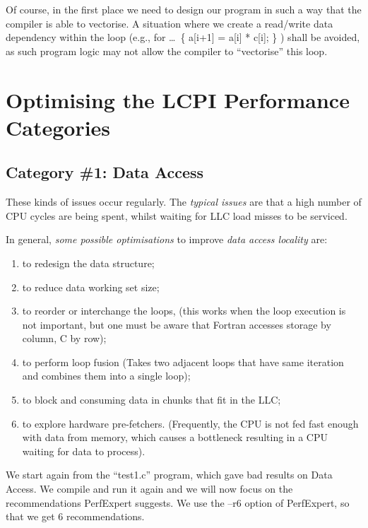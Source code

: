 Of course, in the first place we need to design our program in such a way that the compiler is able to vectorise. A situation where we create a read/write data dependency within the loop (e.g., for \ldots\  \{ a[i+1] = a[i] * c[i]; \} ) shall be avoided, as such program logic may not allow the compiler to ``vectorise'' this loop.

\section{Optimising the LCPI Performance Categories}
\label{sec:Optimizing_the_LCPI_Performance_Categories}

\subsection{Category \#1: Data Access}
\label{subsec:CAT1_Data_Access}

These kinds of issues occur regularly. The \emph{typical issues} are that a high number of CPU cycles are being spent, whilst waiting for LLC load misses to be serviced.

In general, \emph{some possible optimisations} to improve \emph{data access locality} are:

\begin{enumerate}
  \item  to redesign the data structure;
  \item  to reduce data working set size;
  \item  to reorder or interchange the loops, (this works when the loop execution is not important, but one must be aware that Fortran accesses storage by column, C by row);
  \item  to perform loop fusion (Takes two adjacent loops that have same iteration and combines them into a single loop);
  \item  to block and consuming data in chunks that fit in the LLC;
  \item  to explore hardware pre-fetchers. (Frequently, the CPU is not fed fast enough with data from memory, which causes a bottleneck resulting in a CPU waiting for data to process).
\end{enumerate}

We start again from the ``test1.c'' program, which gave bad results on Data Access. We compile and run it again and we will now focus on the recommendations PerfExpert suggests. We use the --r6 option of PerfExpert, so that we get 6 recommendations.


